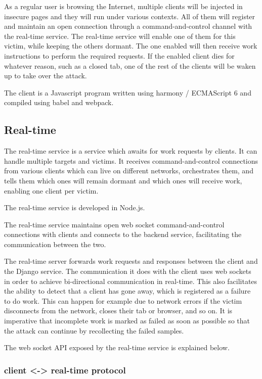 As a regular user is browsing the Internet, multiple clients will be injected
in insecure pages and they will run under various contexts. All of them will
register and maintain an open connection through a command-and-control channel
with the real-time service. The real-time service will enable one of them for
this victim, while keeping the others dormant. The one enabled will then
receive work instructions to perform the required requests. If the enabled
client dies for whatever reason, such as a closed tab, one of the rest of the
clients will be waken up to take over the attack.

The client is a Javascript program written using harmony / ECMAScript 6 and
compiled using babel and webpack.


\subsection{Real-time}

The real-time service is a service which awaits for work requests by clients.
It can handle multiple targets and victims. It receives command-and-control
connections from various clients which can live on different networks,
orchestrates them, and tells them which ones will remain dormant and which ones
will receive work, enabling one client per victim.

The real-time service is developed in Node.js.

The real-time service maintains open web socket command-and-control connections
with clients and connects to the backend service, facilitating the
communication between the two.

The real-time server forwards work requests and responses between the client
and the Django service. The communication it does with the client uses web
sockets in order to achieve bi-directional communication in real-time. This
also facilitates the ability to detect that a client has gone away, which is
registered as a failure to do work. This can happen for example due to network
errors if the victim disconnects from the network, closes their tab or browser,
and so on. It is imperative that incomplete work is marked as failed as soon as
possible so that the attack can continue by recollecting the failed samples.

The web socket API exposed by the real-time service is explained below.

\subsubsection{client <-> real-time protocol}

